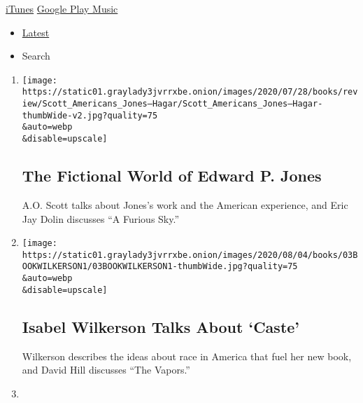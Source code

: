 \href{https://itunes.apple.com/us/podcast/book-review/id120315179?mt=2}{iTunes}
\textbar{}
\href{https://play.google.com/music/listen?u=0\#/ps/Iv6zeb5qwjtzjfbyo3vy5zny5ky}{Google
Play Music}

\begin{itemize}
\tightlist
\item
  \protect\hyperlink{stream-panel}{Latest}
\item
  Search
\end{itemize}

\begin{enumerate}
\def\labelenumi{\arabic{enumi}.}
\item
  \href{/2020/08/14/books/review/podcast-a-o-scott-edward-p-jones-eric-jay-dolin-furious-sky-hurricanes.html}{}

  \texttt{[image: https://static01.graylady3jvrrxbe.onion/images/2020/07/28/books/review/Scott\_Americans\_Jones--Hagar/Scott\_Americans\_Jones--Hagar-thumbWide-v2.jpg?quality=75\\\&auto=webp\\\&disable=upscale]}

  \hypertarget{the-fictional-world-of-edward-p-jones}{%
  \subsection{The Fictional World of Edward P.
  Jones}\label{the-fictional-world-of-edward-p-jones}}

  A.O. Scott talks about Jones's work and the American experience, and
  Eric Jay Dolin discusses ``A Furious Sky.''
\item
  \href{/2020/08/07/books/review/podcast-isabel-wilkerson-caste-david-hill-vapors.html}{}

  \texttt{[image: https://static01.graylady3jvrrxbe.onion/images/2020/08/04/books/03BOOKWILKERSON1/03BOOKWILKERSON1-thumbWide.jpg?quality=75\\\&auto=webp\\\&disable=upscale]}

  \hypertarget{isabel-wilkerson-talks-about-caste}{%
  \subsection{Isabel Wilkerson Talks About
  `Caste'}\label{isabel-wilkerson-talks-about-caste}}

  Wilkerson describes the ideas about race in America that fuel her new
  book, and David Hill discusses ``The Vapors.''
\item
  \href{/2020/07/31/books/review/podcast-twilight-democracy-anne-applebaum-eat-buddha-barbara-demick.html}{}


\end{enumerate}

